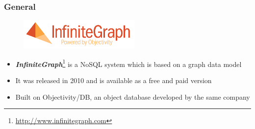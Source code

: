 
\begin{frame}
\frametitle{General}
\begin{figure}[htb]
 	\centering
  	\includegraphics[width=6cm]{images/logo}
\end{figure}
\begin{itemize}
	\item \emph{\textbf{InfiniteGraph}}\footnote{\url{http://www.infinitegraph.com}} is a NoSQL system which is based on a graph data model
	\item It was released in 2010 and is available as a free and paid version
	\item Built on Objectivity/DB, an object database developed by the same company
\end{itemize}
\end{frame} 